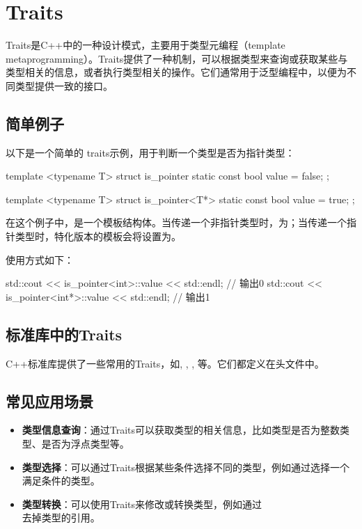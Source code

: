 \chapter{Traits}
Traits是C++中的一种设计模式，主要用于类型元编程（template metaprogramming）。Traits提供了一种机制，可以根据类型来查询或获取某些与类型相关的信息，或者执行类型相关的操作。它们通常用于泛型编程中，以便为不同类型提供一致的接口。

\section{简单例子}
以下是一个简单的 traits示例，用于判断一个类型是否为指针类型：

\begin{cpplst}
template <typename T>
struct is_pointer {
    static const bool value = false;
};

template <typename T>
struct is_pointer<T*> {
    static const bool value = true;
};
\end{cpplst}

在这个例子中，是一个模板结构体。当传递一个非指针类型时，为；当传递一个指针类型时，特化版本的模板会将设置为。

使用方式如下：

\begin{cpplst}
std::cout << is_pointer<int>::value << std::endl;  // 输出0
std::cout << is_pointer<int*>::value << std::endl; // 输出1
\end{cpplst}

\section{标准库中的Traits}
C++标准库提供了一些常用的Traits，如, , , 等。它们都定义在头文件中。

\section{常见应用场景}
\begin{itemize}
	\item \textbf{类型信息查询}：通过Traits可以获取类型的相关信息，比如类型是否为整数类型、是否为浮点类型等。
	\item \textbf{类型选择}：可以通过Traits根据某些条件选择不同的类型，例如通过选择一个满足条件的类型。
	\item \textbf{类型转换}：可以使用Traits来修改或转换类型，例如通过\\去掉类型的引用。
\end{itemize}


